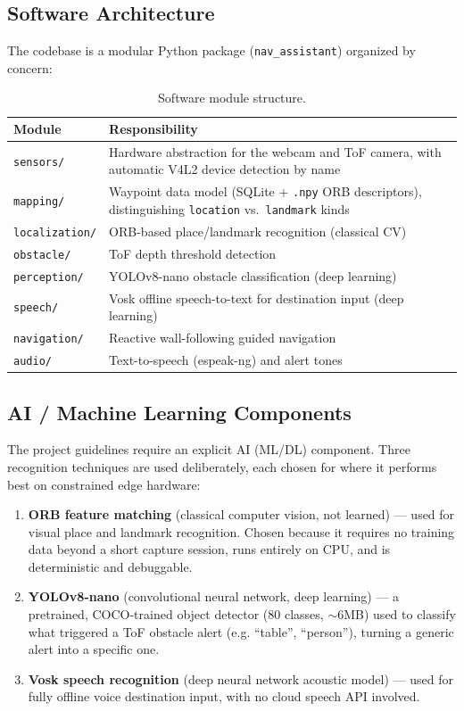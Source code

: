 \documentclass[12pt,a4paper]{article}
\begin{document}
\subsection{Software Architecture}
The codebase is a modular Python package (\texttt{nav\_assistant}) organized by concern:

\begin{table}[H]
\centering
\begin{tabularx}{\textwidth}{l X}
\toprule
\textbf{Module} & \textbf{Responsibility} \\
\midrule
\texttt{sensors/} & Hardware abstraction for the webcam and ToF camera, with automatic V4L2 device detection by name \\
\texttt{mapping/} & Waypoint data model (SQLite + \texttt{.npy} ORB descriptors), distinguishing \texttt{location} vs.\ \texttt{landmark} kinds \\
\texttt{localization/} & ORB-based place/landmark recognition (classical CV) \\
\texttt{obstacle/} & ToF depth threshold detection \\
\texttt{perception/} & YOLOv8-nano obstacle classification (deep learning) \\
\texttt{speech/} & Vosk offline speech-to-text for destination input (deep learning) \\
\texttt{navigation/} & Reactive wall-following guided navigation \\
\texttt{audio/} & Text-to-speech (espeak-ng) and alert tones \\
\bottomrule
\end{tabularx}
\caption{Software module structure.}
\end{table}

\subsection{AI / Machine Learning Components}
\label{sec:ai}
The project guidelines require an explicit AI (ML/DL) component. Three recognition techniques are used deliberately, each chosen for where it performs best on constrained edge hardware:

\begin{enumerate}[leftmargin=1.4cm]
  \item \textbf{ORB feature matching} (classical computer vision, not learned) — used for visual place and landmark recognition. Chosen because it requires no training data beyond a short capture session, runs entirely on CPU, and is deterministic and debuggable.
  \item \textbf{YOLOv8-nano} (convolutional neural network, deep learning) — a pretrained, COCO-trained object detector (80 classes, $\sim$6MB) used to classify what triggered a ToF obstacle alert (e.g. ``table'', ``person''), turning a generic alert into a specific one.
  \item \textbf{Vosk speech recognition} (deep neural network acoustic model) — used for fully offline voice destination input, with no cloud speech API involved.
\end{enumerate}
\end{document}
